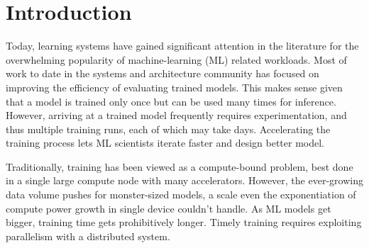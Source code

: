 \chapter {Introduction}

Today, learning systems have gained significant attention in the literature for the overwhelming popularity of machine-learning (ML) related workloads. Most of work to date in the systems and architecture community has focused on improving the efficiency of evaluating trained models. This makes sense given that a model is trained only once but can be used many times for inference. However, arriving at a trained model frequently requires experimentation, and thus multiple training runs, each of which may take days. Accelerating the training process lets ML scientists iterate faster and design better model.

Traditionally, training has been viewed as a compute-bound problem, best done in a single large compute node with many accelerators. However, the ever-growing data volume pushes for monster-sized models, a scale even the exponentiation of compute power growth in single device couldn't handle. As ML models get bigger, training time gets prohibitively longer. Timely training requires exploiting parallelism with a distributed system.

